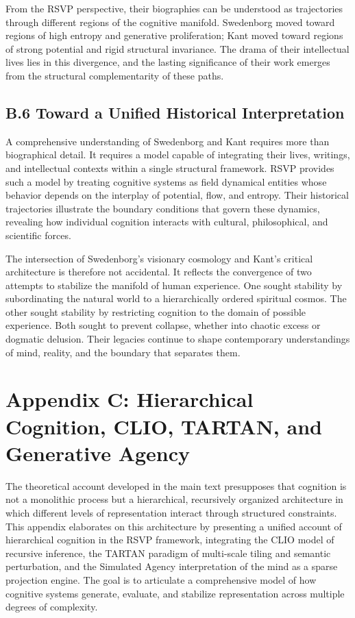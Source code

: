 \documentclass[12pt]{article}
\begin{document}
From the RSVP perspective, their biographies can be understood as trajectories 
through different regions of the cognitive manifold. Swedenborg moved toward 
regions of high entropy and generative proliferation; Kant moved toward 
regions of strong potential and rigid structural invariance. The drama of their 
intellectual lives lies in this divergence, and the lasting significance of 
their work emerges from the structural complementarity of these paths.

\subsection*{B.6 Toward a Unified Historical Interpretation}

A comprehensive understanding of Swedenborg and Kant requires more than 
biographical detail. It requires a model capable of integrating their lives, 
writings, and intellectual contexts within a single structural framework.  
RSVP provides such a model by treating cognitive systems as field dynamical 
entities whose behavior depends on the interplay of potential, flow, and 
entropy. Their historical trajectories illustrate the boundary conditions that 
govern these dynamics, revealing how individual cognition interacts with 
cultural, philosophical, and scientific forces.

The intersection of Swedenborg’s visionary cosmology and Kant’s critical 
architecture is therefore not accidental. It reflects the convergence of two 
attempts to stabilize the manifold of human experience. One sought stability by 
subordinating the natural world to a hierarchically ordered spiritual cosmos.  
The other sought stability by restricting cognition to the domain of possible 
experience. Both sought to prevent collapse, whether into chaotic excess or 
dogmatic delusion. Their legacies continue to shape contemporary understandings 
of mind, reality, and the boundary that separates them.

\newpage
\section*{Appendix C: Hierarchical Cognition, CLIO, TARTAN, and Generative Agency}

The theoretical account developed in the main text presupposes that cognition is 
not a monolithic process but a hierarchical, recursively organized architecture 
in which different levels of representation interact through structured 
constraints. This appendix elaborates on this architecture by presenting a 
unified account of hierarchical cognition in the RSVP framework, integrating the 
CLIO model of recursive inference, the TARTAN paradigm of multi-scale tiling 
and semantic perturbation, and the Simulated Agency interpretation of the mind 
as a sparse projection engine. The goal is to articulate a comprehensive model 
of how cognitive systems generate, evaluate, and stabilize representation across 
multiple degrees of complexity.
\end{document}
